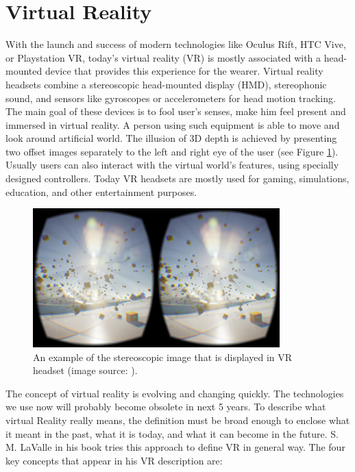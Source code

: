 \section{Virtual Reality}

With the launch and success of modern technologies like Oculus Rift, HTC Vive, or Playstation VR, today’s virtual reality (VR) is mostly associated with a head-mounted device that provides this experience for the wearer. Virtual reality headsets combine a stereoscopic head-mounted display (HMD), stereophonic sound, and sensors like gyroscopes or accelerometers for head motion tracking. The main goal of these devices is to fool user’s senses, make him feel present and immersed in virtual reality. A person using such equipment is able to move and look around artificial world. The illusion of 3D depth is achieved by presenting two offset images separately to the left and right eye of the user (see Figure \ref{fig:STEREOSCOPIC}). Usually users can also interact with the virtual world's features, using specially designed controllers. Today VR headsets are mostly used for gaming, simulations, education, and other entertainment purposes.

\begin{figure}[th]
\centering
\includegraphics[width=0.85\textwidth]{img/stereoscopic.jpg}
\caption{An example of the stereoscopic image that is displayed in VR headset (image source: \cite{STEREOSCOPIC_IMAGE}).}
\label{fig:STEREOSCOPIC}
\end{figure}

The concept of virtual reality is evolving and changing quickly. The technologies we use now will probably become obsolete in next 5 years. To describe what virtual Reality really means, the definition must be broad enough to enclose what it meant in the past, what it is today, and what it can become in the future. S. M. LaValle in his book \cite{VR_BOOK} tries this approach to define VR in general way. The four key concepts that appear in his VR description are:

